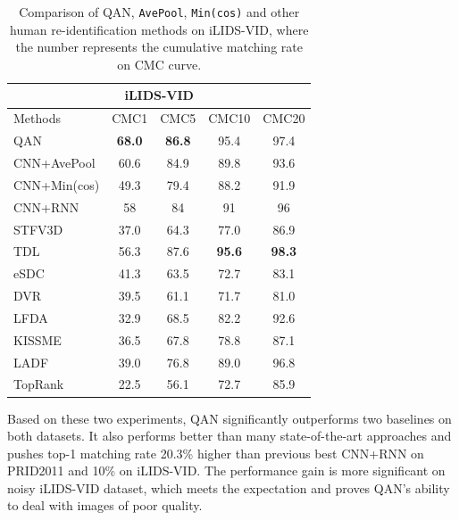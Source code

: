 \begin{table}[!htb]
\normalsize
  \centering
  \begin{tabular}{l|c|c|c|c}
\hline
     \multicolumn{5}{c}{iLIDS-VID}\\
\hline
       Methods & CMC1 &CMC5&CMC10 & CMC20   \\
\hline 

       QAN 	& \textbf{68.0} & \textbf{86.8} & 95.4 & 97.4  \\
       CNN+AvePool 		& 60.6 & 84.9 & 89.8 & 93.6 \\
       CNN+Min(cos) 		& 49.3 & 79.4 & 88.2 & 91.9  \\
\hline
       CNN+RNN\cite{wu2016deep} & 58 & 84 & 91 & 96 \\
       STFV3D\cite{liu2015spatio} & 37.0 & 64.3 & 77.0 & 86.9  \\
       TDL\cite{you2016top} 				& 56.3 & 87.6 & \textbf{95.6} & \textbf{98.3} \\
       eSDC\cite{wang2016person} 	& 41.3 & 63.5 & 72.7 & 83.1  \\
       DVR\cite{wang2016person} 				& 39.5 & 61.1 & 71.7 & 81.0 \\
       LFDA\cite{pedagadi2013local} 				& 32.9 & 68.5 & 82.2 & 92.6 \\
       KISSME\cite{koestinger2012large} 				& 36.5 & 67.8 & 78.8 & 87.1  \\
       LADF\cite{li2013learning} 				& 39.0 & 76.8 & 89.0 & 96.8  \\
       TopRank\cite{li2014top} 			& 22.5 & 56.1 & 72.7 & 85.9 \\
\hline
  \end{tabular}
  \caption{Comparison of QAN, \texttt{AvePool}, \texttt{Min(cos)} and other human re-identification methods on iLIDS-VID, where the number represents the cumulative matching rate on CMC curve.}
  \label{tab2}
\end{table}

Based on these two experiments, QAN significantly outperforms two baselines on both datasets. It also performs better than many state-of-the-art approaches and pushes top-1 matching rate 20.3\% higher than previous best CNN+RNN\cite{wu2016deep} on PRID2011 and 10\%  on iLIDS-VID. The performance gain is more significant on noisy iLIDS-VID dataset, which meets the expectation and proves QAN's ability to deal with images of poor quality.


